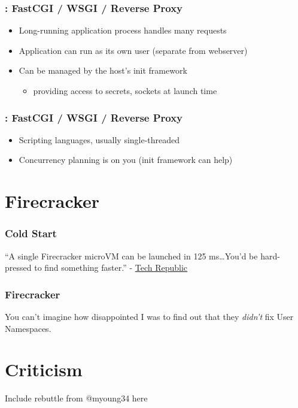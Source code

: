 \documentclass{beamer}
\begin{document}
\begin{frame}
	\frametitle{\insertsection : FastCGI / WSGI / Reverse Proxy}
	\begin{itemize}
		\pause \item Long-running application process handles many requests
		\pause \item Application can run as its own user (separate from webserver)
		\pause \item Can be managed by the host's init framework
			\begin{itemize}
				\item providing access to secrets, sockets at launch time
			\end{itemize}
	\end{itemize}
\end{frame}

\begin{frame}
	\frametitle{\insertsection : FastCGI / WSGI / Reverse Proxy}
	\begin{itemize}
		\pause \item Scripting languages, usually single-threaded
		\pause \item Concurrency planning is on you (init framework can help)
	\end{itemize}
\end{frame}
 
\section{Firecracker}
\frame{\sectionpage}

\begin{frame}
	\frametitle{Cold Start}
	``A single Firecracker microVM can be launched in \alert{125 ms}\ldots You'd be
	hard-pressed to find something faster.''
	- \href{https://www.techrepublic.com/article/aws-firecracker-10-things-every-tech-pro-should-know/}{Tech Republic}
\end{frame}

\begin{frame}
	\frametitle{Firecracker}
	You can't imagine how disappointed I was to find out that they \emph{didn't} fix
	User Namespaces.
\end{frame}
 
\section{Criticism}
\frame{\sectionpage}

\begin{frame}
	Include rebuttle from @myoung34 here
\end{frame}
\end{document}
